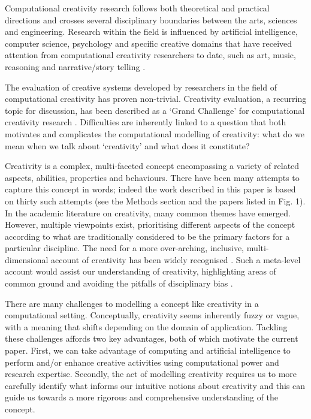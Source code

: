 \documentclass[10pt,letterpaper]{article}
\begin{document}
Computational creativity research follows both theoretical and practical directions and crosses several disciplinary boundaries between the arts, sciences and engineering. Research within the field is influenced by artificial intelligence, computer science, psychology and specific creative domains that have received attention from computational creativity researchers to date, such as art, music, reasoning and narrative/story telling \cite[provide examples]{colton08,widmerAIM09,leon10MM,perezyperez99}. 

The evaluation of creative systems developed by researchers in the field of computational creativity has proven non-trivial. Creativity evaluation, a recurring topic for discussion, has been described as a `Grand Challenge' for computational creativity research \cite{cardoso09}. Difficulties are inherently linked to a question that both motivates and complicates the computational modelling of creativity: what  do we mean when we talk about `creativity' and what does it constitute?

Creativity is a complex, multi-faceted concept encompassing a variety of related aspects, abilities, properties and behaviours. There have been many attempts to capture this concept in words; indeed the work described in this paper is based on thirty such attempts (see the Methods section and the papers listed in Fig. 1).  %
In the academic literature on creativity, many common themes have emerged. 
However, multiple viewpoints exist, prioritising different aspects of the concept according to what are traditionally considered to be the primary factors for a particular discipline. 
The need for a more over-arching, inclusive, multi-dimensional account of creativity has been widely recognised \cite{rhodes61,torrance67,plucker04defn,kaufman09}. Such a meta-level account would assist our understanding of creativity, highlighting areas of common ground and avoiding the pitfalls of disciplinary bias \cite{hennessey10,plucker04}.

There are many challenges to modelling a concept like creativity in a computational setting. Conceptually, creativity seems inherently fuzzy or vague, with a meaning that shifts depending on the domain of application. Tackling these challenges affords two key advantages, both of which motivate the current paper. First, we can take advantage of computing and artificial intelligence to perform and/or enhance creative activities using computational power and research expertise. Secondly, the act of modelling creativity requires us to more carefully identify what informs our intuitive notions about creativity and this can guide us towards a more rigorous and comprehensive understanding of the concept.  
\end{document}
